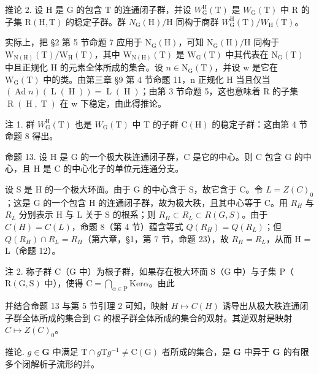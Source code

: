 推论 2. 设 H 是 G 的包含 T 的连通闭子群，并设 \(W_{\mathrm{G}}^{\mathrm{H}}(\mathrm{T})\) 是 \(W_{\mathrm{G}}(\mathrm{T})\) 中 R 的子集 \(\mathrm{R}(\mathrm{H},\mathrm{T})\) 的稳定子群。群 \(N_{\mathrm{G}}(\mathrm{H})/\mathrm{H}\) 同构于商群 \(W_{\mathrm{G}}^{\mathrm{H}}(\mathrm{T})/W_{\mathrm{H}}(\mathrm{T})\)。

实际上，把 §2 第 5 节命题 7 应用于 \(\mathrm{N}_{\mathrm{G}}(\mathrm{H})\)，可知 \(\mathrm{N}_{\mathrm{G}}(\mathrm{H})/\mathrm{H}\) 同构于 \(\mathrm{W}_{\mathrm{N}(\mathrm{H})}(\mathrm{T})/\mathrm{W}_{\mathrm{H}}(\mathrm{T})\)，其中 \(\mathrm{W}_{\mathrm{N}(\mathrm{H})}(\mathrm{T})\) 是 \(\mathrm{W}_{\mathrm{G}}(\mathrm{T})\) 中其代表在 \(\mathrm{N}_{\mathrm{G}}(\mathrm{T})\) 中且正规化 H 的元素全体所成的集合。设 \(n \in \mathrm{N}_{\mathrm{G}}(\mathrm{T})\)，并设 w 是它在 \(\mathrm{W}_{\mathrm{G}}(\mathrm{T})\) 中的类。由第三章 §9 第 4 节命题 11，n 正规化 H 当且仅当 \((\operatorname{Ad} n)(\operatorname{L}(\operatorname{H})) = \operatorname{L}(\operatorname{H})\)；由第 3 节命题 5，这也意味着 R 的子集 \(\operatorname{R}(\operatorname{H}, \operatorname{T})\) 在 w 下稳定，由此得推论。

注 1. 群 \(W_{\mathrm{G}}^{\mathrm{H}}(\mathrm{T})\) 也是 \(W_{\mathrm{G}}(\mathrm{T})\) 中 T 的子群 \(\mathrm{C}(\mathrm{H})\) 的稳定子群：这由第 4 节命题 8 得出。

命题 13. 设 H 是 G 的一个极大秩连通闭子群，C 是它的中心。则 C 包含 G 的中心，且 H 是 C 的中心化子的单位元连通分支。

设 S 是 H 的一个极大环面。由于 G 的中心含于 S，故它含于 C。令 \(L = Z(C)_{0}\)；这是 G 的一个包含 H 的连通闭子群，故为极大秩，且其中心等于 C。用 \(R_{H}\) 与 \(R_{L}\) 分别表示 H 与 L 关于 S 的根系；则 \(R_{H} \subset R_{L} \subset R(G, S)\)。由于 \(C(H) = C(L)\)，命题 8（第 4 节）蕴含等式 \(Q(R_{H}) = Q(R_{L})\)；但 \(Q(R_{H}) \cap R_{L} = R_{H}\)（第六章，§1，第 7 节，命题 23），故 \(R_{H} = R_{L}\)，从而 H = L（命题 12）。

注 2. 称子群 \(\mathrm{C}\)（\(\mathrm{G}\) 中）为根子群，如果存在极大环面 \(\mathrm{S}\)（\(\mathrm{G}\) 中）与子集 \(\mathrm{P}\)（\(\mathrm{R}(\mathrm{G},\mathrm{S})\) 中），使得 \(\mathrm{C} = \bigcap_{\alpha \in \mathrm{P}}\mathrm{Ker}\alpha\)。由此

并结合命题 13 与第 5 节引理 2 可知，映射 \(H \mapsto C(H)\) 诱导出从极大秩连通闭子群全体所成的集合到 G 的根子群全体所成的集合的双射。其逆双射是映射 \(C \mapsto Z(C)_{0}\)。

推论. \(g \in \mathbf{G}\) 中满足 \(\mathrm{T} \cap g\mathrm{T}g^{-1} \neq \mathrm{C}(\mathrm{G})\) 者所成的集合，是 \(\mathbf{G}\) 中异于 \(\mathbf{G}\) 的有限多个闭解析子流形的并。

